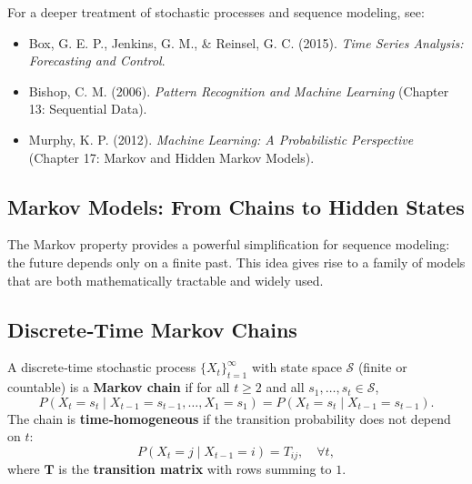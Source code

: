 \documentclass{tufte-handout}
\let\subsubsection\subsection
\begin{document}
For a deeper treatment of stochastic processes and sequence modeling, see:
\begin{itemize}
    \item Box, G. E. P., Jenkins, G. M., \& Reinsel, G. C. (2015). \textit{Time Series Analysis: Forecasting and Control}.
    \item Bishop, C. M. (2006). \textit{Pattern Recognition and Machine Learning} (Chapter 13: Sequential Data).
    \item Murphy, K. P. (2012). \textit{Machine Learning: A Probabilistic Perspective} (Chapter 17: Markov and Hidden Markov Models).
\end{itemize}

\subsection{Markov Models: From Chains to Hidden States}

The Markov property provides a powerful simplification for sequence modeling: the future depends only on a finite past. This idea gives rise to a family of models that are both mathematically tractable and widely used.

\subsubsection{Discrete‑Time Markov Chains}

\begin{defn}
    A discrete‑time stochastic process $\{X_t\}_{t=1}^\infty$ with state space $\mathcal{S}$ (finite or countable) is a \textbf{Markov chain} if for all $t \ge 2$ and all $s_1,\dots,s_t \in \mathcal{S}$,
    \[
    P(X_t = s_t \mid X_{t-1}=s_{t-1}, \dots, X_1=s_1) = P(X_t = s_t \mid X_{t-1}=s_{t-1}).
    \]
    The chain is \textbf{time‑homogeneous} if the transition probability does not depend on $t$:
    \[
    P(X_t = j \mid X_{t-1}=i) = T_{ij}, \quad \forall t,
    \]
    where $\mathbf{T}$ is the \textbf{transition matrix} with rows summing to $1$.
\end{defn}

\begin{marginfigure}
\centering
{}
\caption{A three‑state Markov chain with transition probabilities.}
\end{marginfigure}
\end{document}
